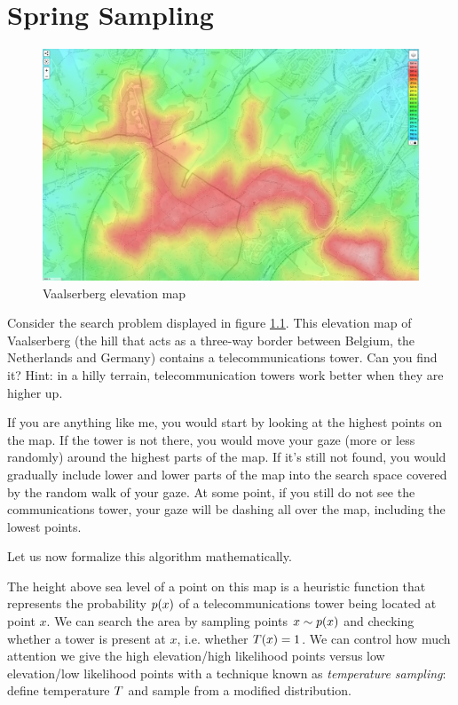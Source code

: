 
\chapter{Spring Sampling}
\label{apdx:spring}

\begin{figure}
    \centering
    \includegraphics[width=\linewidth]{images/vaalserberg_lost.png}
    \caption{Vaalserberg elevation map}
    \label{fig:vaalserberg-q}
\end{figure}


Consider the search problem displayed in figure \ref{fig:vaalserberg-q}. 
This elevation map of Vaalserberg (the hill that acts as a three-way border between Belgium, the Netherlands and Germany) contains a telecommunications tower. 
Can you find it? Hint: in a hilly terrain, telecommunication towers work better when they are higher up.

If you are anything like me, you would start by looking at the highest points on the map.
If the tower is not there, you would move your gaze (more or less randomly) around the highest parts of the map.
If it's still not found, you would gradually include lower and lower parts of the map into the search space covered by the random walk of your gaze.
At some point, if you still do not see the communications tower, your gaze will be dashing all over the map, including the lowest points.

Let us now formalize this algorithm mathematically.

The height above sea level of a point on this map is a heuristic function that represents the probability $p(x)$ of a telecommunications tower being located at point $x$.
We can search the area by sampling points $x \sim p(x)$ and checking whether a tower is present at $x$, i.e. whether $T(x)=1$.
We can control how much attention we give the high elevation/high likelihood points versus low elevation/low likelihood points with a technique known as \emph{temperature sampling}: define temperature $T$ and sample from a modified distribution.

